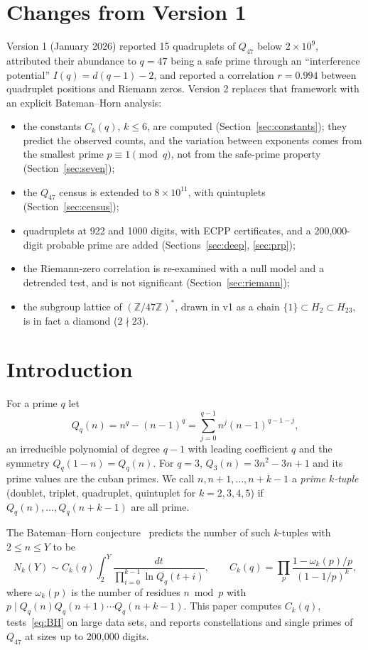 \documentclass[11pt,a4paper]{article}
\theoremstyle{remark}
\begin{document}
\section*{Changes from Version 1}
Version 1 (January 2026) reported 15 quadruplets of $Q_{47}$ below $2\times10^9$, attributed their abundance to $q=47$ being a safe prime through an ``interference potential'' $I(q)=d(q-1)-2$, and reported a correlation $r=0.994$ between quadruplet positions and Riemann zeros. Version 2 replaces that framework with an explicit Bateman--Horn analysis:
\begin{itemize}
\item the constants $C_k(q)$, $k\le 6$, are computed (Section~\ref{sec:constants}); they predict the observed counts, and the variation between exponents comes from the smallest prime $p\equiv 1 \pmod q$, not from the safe-prime property (Section~\ref{sec:seven});
\item the $Q_{47}$ census is extended to $8\times10^{11}$, with quintuplets (Section~\ref{sec:census});
\item quadruplets at 922 and 1000 digits, with ECPP certificates, and a 200,000-digit probable prime are added (Sections~\ref{sec:deep}, \ref{sec:prp});
\item the Riemann-zero correlation is re-examined with a null model and a detrended test, and is not significant (Section~\ref{sec:riemann});
\item the subgroup lattice of $(\mathbb{Z}/47\mathbb{Z})^\ast$, drawn in v1 as a chain $\{1\}\subset H_2\subset H_{23}$, is in fact a diamond ($2\nmid 23$).
\end{itemize}

\section{Introduction}
For a prime $q$ let
\begin{equation}
Q_q(n) = n^q - (n-1)^q = \sum_{j=0}^{q-1} n^j (n-1)^{q-1-j},
\end{equation}
an irreducible polynomial of degree $q-1$ with leading coefficient $q$ and the symmetry $Q_q(1-n)=Q_q(n)$. For $q=3$, $Q_3(n)=3n^2-3n+1$ and its prime values are the cuban primes. We call $n,n+1,\dots,n+k-1$ a \emph{prime $k$-tuple} (doublet, triplet, quadruplet, quintuplet for $k=2,3,4,5$) if $Q_q(n),\dots,Q_q(n+k-1)$ are all prime.

The Bateman--Horn conjecture~\cite{BH} predicts the number of such $k$-tuples with $2\le n\le Y$ to be
\begin{equation}\label{eq:BH}
N_k(Y) \sim C_k(q)\int_2^Y \frac{dt}{\prod_{i=0}^{k-1}\ln Q_q(t+i)},\qquad
C_k(q) = \prod_p \frac{1-\omega_k(p)/p}{(1-1/p)^k},
\end{equation}
where $\omega_k(p)$ is the number of residues $n \bmod p$ with $p \mid Q_q(n)Q_q(n+1)\cdots Q_q(n+k-1)$. This paper computes $C_k(q)$, tests~\eqref{eq:BH} on large data sets, and reports constellations and single primes of $Q_{47}$ at sizes up to 200,000 digits.
\end{document}
